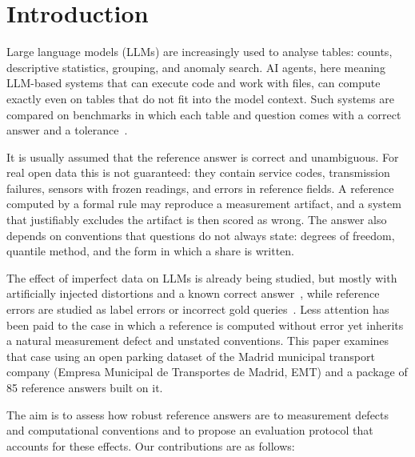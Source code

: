 \documentclass[default]{subfiles}
\begin{document}
{

\maketitle

\section{Introduction}

Large language models (LLMs) are increasingly used to analyse tables: counts, descriptive statistics, grouping, and anomaly search. AI agents, here meaning LLM-based systems that can execute code and work with files, can compute exactly even on tables that do not fit into the model context. Such systems are compared on benchmarks in which each table and question comes with a correct answer and a tolerance~\cite{lai2023,hu2024,huang2024,jing2024}.

It is usually assumed that the reference answer is correct and unambiguous. For real open data this is not guaranteed: they contain service codes, transmission failures, sensors with frozen readings, and errors in reference fields. A reference computed by a formal rule may reproduce a measurement artifact, and a system that justifiably excludes the artifact is then scored as wrong. The answer also depends on conventions that questions do not always state: degrees of freedom, quantile method, and the form in which a share is written.

The effect of imperfect data on LLMs is already being studied, but mostly with artificially injected distortions and a known correct answer~\cite{gu2025,wolff2025}, while reference errors are studied as label errors or incorrect gold queries~\cite{northcutt2021,wretblad2024}. Less attention has been paid to the case in which a reference is computed without error yet inherits a natural measurement defect and unstated conventions. This paper examines that case using an open parking dataset of the Madrid municipal transport company (Empresa Municipal de Transportes de Madrid, EMT) and a package of 85 reference answers built on it.

The aim is to assess how robust reference answers are to measurement defects and computational conventions and to propose an evaluation protocol that accounts for these effects. Our contributions are as follows:

}
\end{document}
